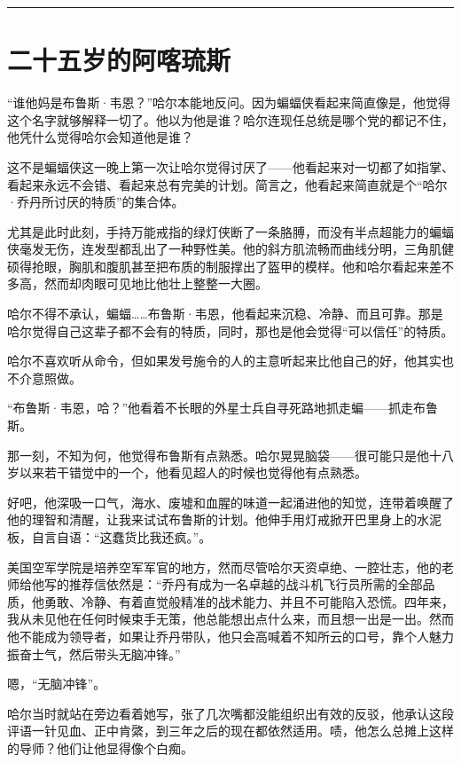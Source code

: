 \documentclass[../main]{subfiles}
\begin{document}
\begin{center}\rule{0.5\linewidth}{0.5pt}\end{center}

\section{二十五岁的阿喀琉斯}

“谁他妈是布鲁斯·韦恩？”哈尔本能地反问。因为蝙蝠侠看起来简直像是，他觉得这个名字就够解释一切了。他以为他是谁？哈尔连现任总统是哪个党的都记不住，他凭什么觉得哈尔会知道他是谁？

这不是蝙蝠侠这一晚上第一次让哈尔觉得讨厌了——他看起来对一切都了如指掌、看起来永远不会错、看起来总有完美的计划。简言之，他看起来简直就是个“哈尔·乔丹所讨厌的特质”的集合体。

尤其是此时此刻，手持万能戒指的绿灯侠断了一条胳膊，而没有半点超能力的蝙蝠侠毫发无伤，连发型都乱出了一种野性美。他的斜方肌流畅而曲线分明，三角肌健硕得抢眼，胸肌和腹肌甚至把布质的制服撑出了盔甲的模样。他和哈尔看起来差不多高，然而却肉眼可见地比他壮上整整一大圈。

哈尔不得不承认，蝙蝠……布鲁斯·韦恩，他看起来沉稳、冷静、而且可靠。那是哈尔觉得自己这辈子都不会有的特质，同时，那也是他会觉得“可以信任”的特质。

哈尔不喜欢听从命令，但如果发号施令的人的主意听起来比他自己的好，他其实也不介意照做。

“布鲁斯·韦恩，哈？”他看着不长眼的外星士兵自寻死路地抓走蝙——抓走布鲁斯。

那一刻，不知为何，他觉得布鲁斯有点熟悉。哈尔晃晃脑袋——很可能只是他十八岁以来若干错觉中的一个，他看见超人的时候也觉得他有点熟悉。

好吧，他深吸一口气，海水、废墟和血腥的味道一起涌进他的知觉，连带着唤醒了他的理智和清醒，让我来试试布鲁斯的计划。他伸手用灯戒掀开巴里身上的水泥板，自言自语：“这蠢货比我还疯。”。

美国空军学院是培养空军军官的地方，然而尽管哈尔天资卓绝、一腔壮志，他的老师给他写的推荐信依然是：“乔丹有成为一名卓越的战斗机飞行员所需的全部品质，他勇敢、冷静、有着直觉般精准的战术能力、并且不可能陷入恐慌。四年来，我从未见他在任何时候束手无策，他总能想出点什么来，而且想一出是一出。然而他不能成为领导者，如果让乔丹带队，他只会高喊着不知所云的口号，靠个人魅力振奋士气，然后带头无脑冲锋。”

嗯，“无脑冲锋”。

哈尔当时就站在旁边看着她写，张了几次嘴都没能组织出有效的反驳，他承认这段评语一针见血、正中肯綮，到三年之后的现在都依然适用。啧，他怎么总摊上这样的导师？他们让他显得像个白痴。
\end{document}
